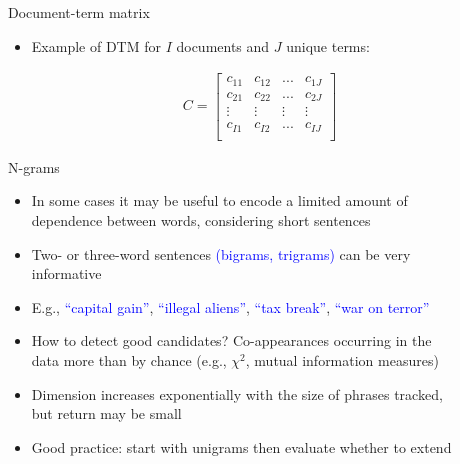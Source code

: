 \documentclass[english]{beamer}
\begin{document}
\begin{frame}{Document-term matrix}
\begin{itemize}
\setlength{\itemsep}{1.2em}
\item Example of DTM for $I$ documents and $J$ unique terms:
\end{itemize}
\begin{align*}
C = \begin{bmatrix}
c_{11} & c_{12} & ... & c_{1J} \\
c_{21} & c_{22} & ... & c_{2J} \\
\vdots & \vdots & \vdots & \vdots\\
c_{I1} & c_{I2} & ... & c_{IJ} \\
\end{bmatrix}
\end{align*}
\end{frame}

\begin{frame}{N-grams}

\begin{itemize}
\setlength{\itemindent}{-0.8em}
\setlength{\itemsep}{0.9em}
\item In some cases it may be useful to encode a limited amount of\\
\hspace{-9pt}dependence between words, considering short sentences
\item Two- or three-word sentences \textcolor{blue}{(bigrams, trigrams)} can be very\\
\hspace{-8pt}informative
\item E.g.,  \textcolor{blue}{``capital gain''},  \textcolor{blue}{``illegal aliens''},  \textcolor{blue}{``tax break''},  \textcolor{blue}{``war on terror''}
\item How to detect good candidates? Co-appearances occurring in the\\
\hspace{-8pt}data more than by chance  (e.g., $\chi^2$, mutual information measures)
\item Dimension increases exponentially with the size of phrases tracked,\\
\hspace{-8pt}but return may be small
\item Good practice: start with unigrams then evaluate  whether to extend

\end{itemize}
\end{frame}
\end{document}

